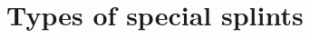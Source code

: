 \documentclass[pdftex]{beamer}
\newtheorem{Utv}{Proposition}
\theoremstyle{definition} \newtheorem{Def}{Definition}
\begin{document}
\section{Types of special splints}
\end{document}
